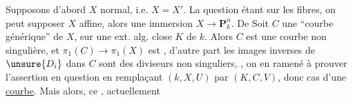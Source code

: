 Supposons d'abord $X$ normal, i.e. $X=X'$.
 La question étant
 sur les fibres,
on peut supposer $X$ affine, alors  une immersion
$X\longrightarrow\mathbf P_k^n$.
De 
Soit $C$ une ``courbe générique'' de $X$,
sur une ext. alg. close $K$ de $k$.
Alors $C$ est une courbe non singulière, et
$\pi_1(C)\to\pi_1(X)$ est , d'autre part les images inverses
de $\unsure{D_i}$ dans $C$ sont des diviseurs non singuliers,
, on en 
ramené à prouver l'assertion en question en remplaçant $(k,X,U)$ par
$(K,C,V)$, donc cas d'une \uline{courbe}.
Mais alors, ce , actuellement

